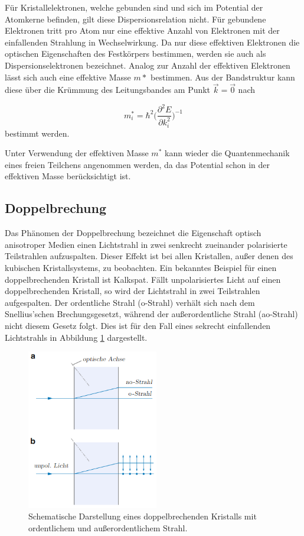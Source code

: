 Für Kristallelektronen, welche gebunden sind und sich im Potential der
Atomkerne befinden, gilt diese Dispersionsrelation nicht. Für gebundene
Elektronen tritt pro Atom nur eine effektive Anzahl von Elektronen mit der einfallenden
Strahlung in Wechselwirkung. Da nur diese effektiven Elektronen die optischen
Eigenschaften des Festkörpers bestimmen, werden sie auch als Dispersionselektronen
bezeichnet. Analog zur Anzahl der effektiven Elektronen lässt sich auch eine
effektive Masse $m*$ bestimmen. Aus der Bandstruktur kann diese über die Krümmung des
Leitungsbandes am Punkt $\vec{k}=\vec{0}$ nach

\begin{equation}
  m^*_i=\hbar^2\Big(\frac{\partial^2 E}{\partial k^2_i} \Big)^{-1}
\end{equation}
bestimmt werden.

Unter Verwendung der effektiven Masse $m^*$ kann wieder die Quantenmechanik eines
freien Teilchens angenommen werden, da das Potential schon in der effektiven Masse
berücksichtigt ist.

\subsection{Doppelbrechung}
Das Phänomen der Doppelbrechung bezeichnet die Eigenschaft optisch anisotroper Medien einen Lichtstrahl in
zwei senkrecht zueinander polarisierte Teilstrahlen aufzuspalten. Dieser Effekt ist bei allen Kristallen, außer
denen des kubischen Kristallsystems, zu beobachten. Ein bekanntes Beispiel für einen doppelbrechenden Kristall ist
Kalkspat.
Fällt unpolarisiertes Licht auf einen doppelbrechenden Kristall, so wird der
Lichtstrahl in zwei Teilstrahlen aufgespalten. Der ordentliche Strahl (o-Strahl)
verhält sich nach dem Snellius'schen Brechungsgesetzt, während der außerordentliche Strahl
(ao-Strahl) nicht diesem Gesetz folgt. Dies ist für den Fall eines sekrecht
einfallenden Lichtstrahls in Abbildung \ref{fig:Doppelbrechend} dargestellt.

\begin{figure}[H]
  \centering
  \includegraphics[height=7cm]{Doppelbrechend.png}
  \caption{Schematische Darstellung eines doppelbrechenden Kristalls mit ordentlichem und außerordentlichem Strahl.}
  \label{fig:Doppelbrechend}
\end{figure}

